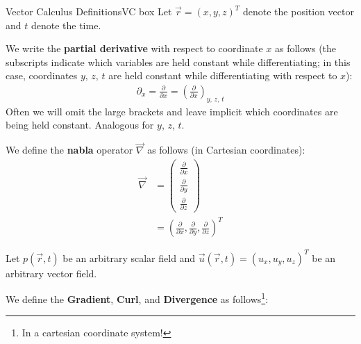 \begin{fact}{Vector Calculus Definitions}{VC box}\label{VC box}
    Let \(\vec{r}=(x,y,z)^T\) denote the position vector and \(t\) denote the time.\vspace{3mm}

    \begin{minipage}{0.49\linewidth}
        We write the \textbf{partial derivative} with respect to coordinate \(x\) as follows (the subscripts indicate which variables are held constant while differentiating; in this case, coordinates \(y, \, z,\, t\) are held constant while differentiating with respect to \(x\)):
        \begin{align}\label{partial}
            \partial_{x}=\frac{\partial}{\partial x}=\left( \frac{\partial}{\partial x} \right)_{y,\,z,\,t}
        \end{align}
        Often we will omit the large brackets and leave implicit which coordinates are being held constant. Analogous for \(y\), \(z\), \(t\).
    \end{minipage}
    \hfill
    \begin{minipage}{0.49\linewidth}
        We define the \textbf{nabla} operator \(\vec{\nabla}\) as follows (in Cartesian coordinates):
        \begin{align}
            \vec{\nabla}&=\left( \begin{array}{c}
                \frac{\partial}{\partial x}\\[6pt]
                \frac{\partial}{\partial y}\\[6pt]
                \frac{\partial}{\partial z}
            \end{array} \right)
            \\
            &=\left( \frac{\partial}{\partial x}, \frac{\partial}{\partial y}, \frac{\partial}{\partial z} \right)^T \nonumber
        \end{align}
    \end{minipage}

    \vspace{3mm}Let \(p(\vec{r},t)\) be an arbitrary scalar field and \(\vec{u}(\vec{r},t)=(u_x,u_y,u_z)^T\) be an arbitrary vector field.

    We define the \textbf{Gradient}, \textbf{Curl}, and \textbf{Divergence} as follows\footnote{In a cartesian coordinate system!}:


\end{fact}
